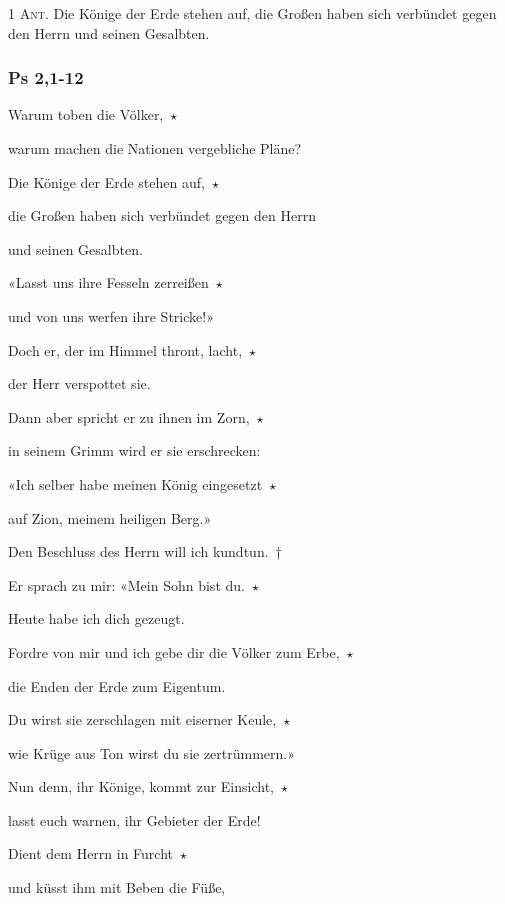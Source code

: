 \noindent \textsc{1 Ant.} Die Könige der Erde stehen auf, die Großen haben sich verbündet gegen den Herrn und seinen Gesalbten.

\subsubsection{Ps 2,1-12}

\noindent Warum toben die Völker,~$\star$~\nopagebreak

warum machen die Nationen vergebliche Pläne?
 
\noindent Die Könige der Erde stehen auf,~$\star$~\nopagebreak

die Großen haben sich verbündet gegen den Herrn 

und seinen Gesalbten.
 
\noindent «Lasst uns ihre Fesseln zerreißen~$\star$~\nopagebreak

und von uns werfen ihre Stricke!»
 
\noindent Doch er, der im Himmel thront, lacht,~$\star$~\nopagebreak

der Herr verspottet sie.
 
\noindent Dann aber spricht er zu ihnen im Zorn,~$\star$~\nopagebreak

in seinem Grimm wird er sie erschrecken:
 
\noindent «Ich selber habe meinen König eingesetzt~$\star$~\nopagebreak

auf Zion, meinem heiligen Berg.»
 
\noindent Den Beschluss des Herrn will ich kundtun.~†~\nopagebreak

Er sprach zu mir: «Mein Sohn bist du.~$\star$~\nopagebreak

Heute habe ich dich gezeugt.
 
\noindent Fordre von mir und ich gebe dir die Völker zum Erbe,~$\star$~\nopagebreak

die Enden der Erde zum Eigentum.
 
\noindent Du wirst sie zerschlagen mit eiserner Keule,~$\star$~\nopagebreak

wie Krüge aus Ton wirst du sie zertrümmern.»
 
\noindent Nun denn, ihr Könige, kommt zur Einsicht,~$\star$~\nopagebreak

lasst euch warnen, ihr Gebieter der Erde!
 
\noindent Dient dem Herrn in Furcht~$\star$~\nopagebreak

und küsst ihm mit Beben die Füße,
 
